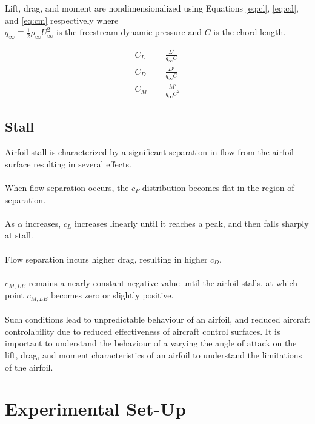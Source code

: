 \documentclass[runningheads]{llncs}
\begin{document}
Lift, drag, and moment are nondimensionalized using Equations \ref{eq:cl}, \ref{eq:cd}, and \ref{eq:cm} respectively where\\
$q_\infty\equiv\frac{1}{2}\rho_\infty U_\infty^2$ is the freestream dynamic pressure and $C$ is the chord length.

\begin{align}
    C_L &= \frac{L'}{q_\infty C}
    \label{eq:cl}\\
    C_D &= \frac{D'}{q_\infty C}
    \label{eq:cd}\\
    C_M &= \frac{M'}{q_\infty C^2}
    \label{eq:cm}
\end{align}

\subsection{Stall}
Airfoil stall is characterized by a significant separation in flow from the airfoil surface resulting in several effects.\\
\\
When flow separation occurs, the $c_P$ distribution becomes flat in the region of separation.\\
\\
As $\alpha$ increases, $c_L$ increases linearly until it reaches a peak, and then falls sharply at stall.\\
\\
Flow separation incurs higher drag, resulting in higher $c_D$.\\
\\
$c_{M, LE}$ remains a nearly constant negative value until the airfoil stalls, at which point $c_{M, LE}$ becomes zero or slightly positive.\\
\\
Such conditions lead to unpredictable behaviour of an airfoil, and reduced aircraft controlability due to reduced effectiveness of aircraft control surfaces. It is important to understand the behaviour of a varying the angle of attack on the lift, drag, and moment characteristics of an airfoil to understand the limitations of the airfoil.





\section{Experimental Set-Up}
\end{document}
